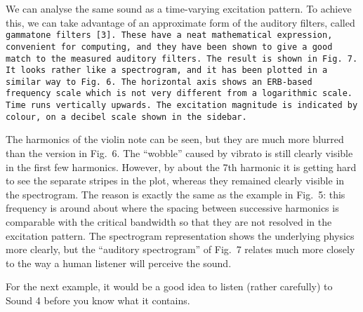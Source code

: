

  We can analyse the same sound as a time-varying excitation pattern. To 
  achieve this, we can take advantage of an approximate form of the auditory 
  filters, called \tt{}gammatone filters\rm{} [3]. These have a neat 
  mathematical expression, convenient for computing, and they have been shown 
  to give a good match to the measured auditory filters. The result is shown in 
  Fig.\ 7. It looks rather like a spectrogram, and it has been plotted in a 
  similar way to Fig.\ 6. The horizontal axis shows an ERB-based frequency 
  scale which is not very different from a logarithmic scale. Time runs 
  vertically upwards. The excitation magnitude is indicated by colour, on a 
  decibel scale shown in the sidebar. 


  The harmonics of the violin note can be seen, but they are much more blurred 
  than the version in Fig.\ 6. The ``wobble'' caused by vibrato is still 
  clearly visible in the first few harmonics. However, by about the 7th 
  harmonic it is getting hard to see the separate stripes in the plot, whereas 
  they remained clearly visible in the spectrogram. The reason is exactly the 
  same as the example in Fig.\ 5: this frequency is around about where the 
  spacing between successive harmonics is comparable with the critical 
  bandwidth so that they are not resolved in the excitation pattern. The 
  spectrogram representation shows the underlying physics more clearly, but the 
  ``auditory spectrogram'' of Fig.\ 7 relates much more closely to the way a 
  human listener will perceive the sound. 

  For the next example, it would be a good idea to listen (rather carefully) to 
  Sound 4 before you know what it contains. 



